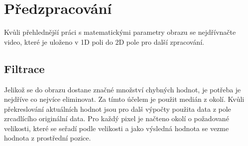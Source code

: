 



\section{Předzpracování}

Kvůli přehlednější práci s matematickými parametry obrazu se nejdřívnačte video, které je uloženo v 1D poli do 2D pole pro další zpracování.\\

\subsection{Filtrace}
Jelikož se do obrazu dostane značné množství chybných hodnot, je potřeba je nejdříve co nejvíce eliminovat. Za tímto účelem je použit medián z okolí. Kvůli překreslování aktuálních hodnot jsou pro dalš výpočty použita data z pole zrcadlícího originální data. Pro každý pixel je načteno okolí o požadované velikosti, které se seřadí podle velikosti a jako výsledná hodnota se vezme hodnota z prostřední pozice.\\

